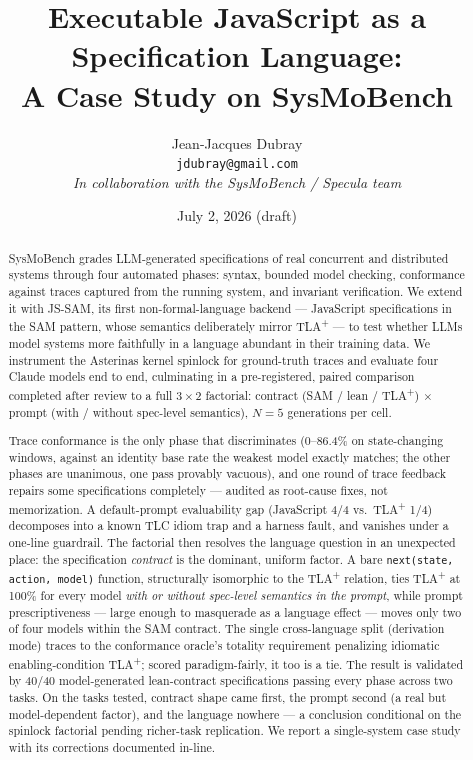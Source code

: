 \documentclass[11pt]{article}
\title{\textbf{Executable JavaScript as a Specification Language:\\
A \jssam{} Case Study on SysMoBench}}
\author{
  Jean-Jacques Dubray\\
  \texttt{jdubray@gmail.com}\\[0.5em]
  \small\textit{In collaboration with the SysMoBench / Specula team}
}
\date{July 2, 2026 \quad (draft)}
\newcommand{\jssam}{JS-SAM}
\newcommand{\tlaplus}{TLA\texorpdfstring{\textsuperscript{+}}{+}}
\begin{document}
\maketitle

\begin{abstract}
SysMoBench grades LLM-generated specifications of real concurrent and
distributed systems through four automated phases: syntax, bounded model
checking, conformance against traces captured from the running system, and
invariant verification. We extend it with \jssam{}, its first
non-formal-language backend --- JavaScript specifications in the SAM
pattern, whose semantics deliberately mirror \tlaplus{} --- to test whether
LLMs model systems more faithfully in a language abundant in their training
data. We instrument the Asterinas kernel spinlock for ground-truth traces
and evaluate four Claude models end to end, culminating in a
pre-registered, paired comparison completed after review to a full
$3{\times}2$ factorial: contract (SAM / lean / \tlaplus{}) $\times$ prompt
(with / without spec-level semantics), $N{=}5$ generations per cell.

Trace conformance is the only
phase that discriminates (0--86.4\% on state-changing windows, against an
identity base rate the weakest model exactly matches; the other phases are
unanimous, one pass provably vacuous), and one round of trace feedback
repairs some specifications completely --- audited as root-cause fixes, not
memorization. A default-prompt evaluability gap (JavaScript 4/4 vs.\
\tlaplus{} 1/4) decomposes into a known TLC idiom trap and a harness fault,
and vanishes under a one-line guardrail. The factorial then resolves
the language question in an unexpected place: the specification
\emph{contract} is the dominant, uniform factor. A bare
\texttt{next(state, action, model)} function, structurally isomorphic to the
\tlaplus{} relation, ties \tlaplus{} at 100\% for every model \emph{with or
without spec-level semantics in the prompt}, while prompt prescriptiveness
--- large enough to masquerade as a language effect --- moves only two of
four models within the SAM contract. The single cross-language split
(derivation mode) traces to the conformance oracle's totality requirement
penalizing idiomatic enabling-condition \tlaplus{}; scored paradigm-fairly,
it too is a tie. The result is validated by 40/40 model-generated
lean-contract specifications passing every phase across two tasks. On the
tasks tested, contract shape came first, the prompt second (a real but
model-dependent factor), and the language nowhere --- a conclusion
conditional on the spinlock factorial pending richer-task replication. We
report a single-system case study with its corrections documented in-line.
\end{abstract}
\end{document}
